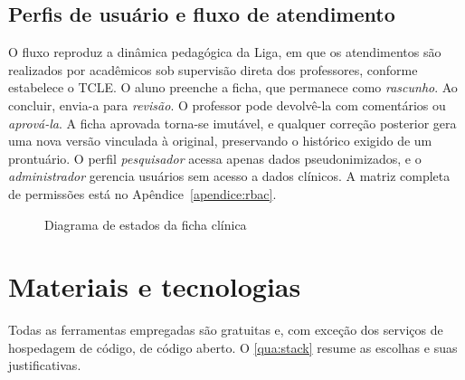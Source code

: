 \subsection{Perfis de usuário e fluxo de atendimento}

O fluxo reproduz a dinâmica pedagógica da Liga, em que os atendimentos são realizados por acadêmicos sob supervisão direta dos professores, conforme estabelece o TCLE. O aluno preenche a ficha, que permanece como \emph{rascunho}. Ao concluir, envia-a para \emph{revisão}. O professor pode devolvê-la com comentários ou \emph{aprová-la}. A ficha aprovada torna-se imutável, e qualquer correção posterior gera uma nova versão vinculada à original, preservando o histórico exigido de um prontuário. O perfil \emph{pesquisador} acessa apenas dados pseudonimizados, e o \emph{administrador} gerencia usuários sem acesso a dados clínicos. A matriz completa de permissões está no Apêndice~\ref{apendice:rbac}.

\begin{figure}[htbp]
	\caption{Diagrama de estados da ficha clínica}
	\label{fig:estados-ficha}
	\centering
	\resizebox{\textwidth}{!}{}
\end{figure}

\section{Materiais e tecnologias}
\label{sec:tecnologias}

Todas as ferramentas empregadas são gratuitas e, com exceção dos serviços de hospedagem de código, de código aberto. O \autoref{qua:stack} resume as escolhas e suas justificativas.

